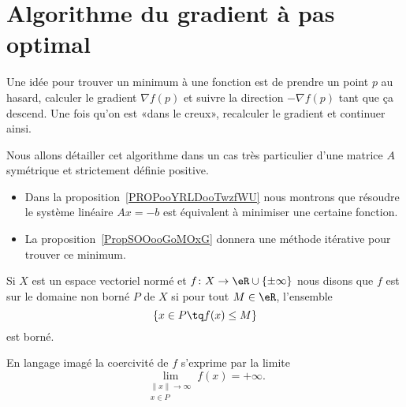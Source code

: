 
\section{Algorithme du gradient à pas optimal}

Une idée pour trouver un minimum à une fonction est de prendre un point \( p\) au hasard, calculer le gradient \(\nabla f(p) \) et suivre la direction \(-\nabla f(p)\) tant que ça descend. Une fois qu'on est «dans le creux», recalculer le gradient et continuer ainsi.

Nous allons détailler cet algorithme dans un cas très particulier d'une matrice \( A\) symétrique et strictement définie positive.
\begin{itemize}
	\item Dans la proposition~\ref{PROPooYRLDooTwzfWU} nous montrons que résoudre le système linéaire \( Ax=-b\) est équivalent à minimiser une certaine fonction.
	\item La proposition~\ref{PropSOOooGoMOxG} donnera une méthode itérative pour trouver ce minimum.
\end{itemize}

\begin{definition}  \label{DefQXPooYSygGP}
	Si \( X\) est un espace vectoriel normé et \( f\colon X\to \eR\cup\{ \pm\infty \}\) nous disons que \( f\) est  sur le domaine non borné \( P\) de \( X\) si pour tout \( M\in \eR\), l'ensemble
	\begin{equation}
		\{ x\in P\tq f(x)\leq M \}
	\end{equation}
	est borné.
\end{definition}
En langage imagé la coercivité de \( f\) s'exprime par la limite
\begin{equation}
	\lim_{\substack{\| x \|\to \infty\\x\in P}}f(x)=+\infty.
\end{equation}


